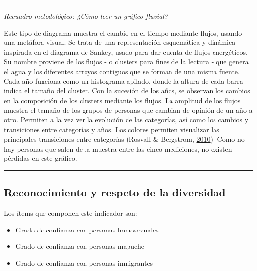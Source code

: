 \documentclass[
  12pt,
]{book}
\begin{document}
\begin{center}\rule{0.5\linewidth}{0.5pt}\end{center}

\emph{Recuadro metodológico: ¿Cómo leer un gráfico fluvial?}

Este tipo de diagrama muestra el cambio en el tiempo mediante flujos, usando una metáfora visual. Se trata de una representación esquemática y dinámica inspirada en el diagrama de Sankey, usado para dar cuenta de flujos energéticos. Su nombre proviene de los flujos - o clusters para fines de la lectura - que genera el agua y los diferentes arroyos contiguos que se forman de una misma fuente. Cada año funciona como un histograma apilado, donde la altura de cada barra indica el tamaño del cluster. Con la sucesión de los años, se observan los cambios en la composición de los clusters mediante los flujos. La amplitud de los flujos muestra el tamaño de los grupos de personas que cambian de opinión de un año a otro. Permiten a la vez ver la evolución de las categorías, así como los cambios y transiciones entre categorías y años. Los colores permiten visualizar las principales transiciones entre categorías (Rosvall \& Bergstrom, \protect\hyperlink{ref-rosvall_mapping_2010}{2010}). Como no hay personas que salen de la muestra entre las cinco mediciones, no existen pérdidas en este gráfico.

\begin{center}\rule{0.5\linewidth}{0.5pt}\end{center}

\hypertarget{reconocimiento-y-respeto-de-la-diversidad}{%
\subsection{Reconocimiento y respeto de la diversidad}\label{reconocimiento-y-respeto-de-la-diversidad}}

Los ítems que componen este indicador son:

\begin{itemize}
\item
  Grado de confianza con personas homosexuales
\item
  Grado de confianza con personas mapuche
\item
  Grado de confianza con personas inmigrantes
\end{itemize}
\end{document}
